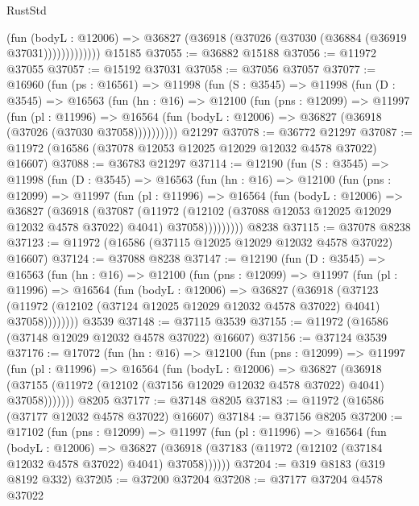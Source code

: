 \begin{lexlean}{RustStd}
\begin{coremodule}
                  (fun (bodyL : @12006) =>
                  @36827 (@36918 (@37026 (@37030 (@36884 (@36919 @37031)))))))))))))
    @15185
@37055 := @36882 @15188
@37056 := @11972 @37055
@37057 := @15192 @37031
@37058 := @37056 @37057
@37077 := @16960
    (fun (ps : @16561) =>
    @11998
      (fun (S : @3545) =>
      @11998
        (fun (D : @3545) =>
        @16563
          (fun (hn : @16) =>
          @12100
            (fun (pns : @12099) =>
            @11997
              (fun (pl : @11996) =>
              @16564 (fun (bodyL : @12006) => @36827 (@36918 (@37026 (@37030 @37058))))))))))
    @21297
@37078 := @36772 @21297
@37087 := @11972 (@16586 (@37078 @12053 @12025 @12029 @12032 @4578 @37022) @16607)
@37088 := @36783 @21297
@37114 := @12190
    (fun (S : @3545) =>
    @11998
      (fun (D : @3545) =>
      @16563
        (fun (hn : @16) =>
        @12100
          (fun (pns : @12099) =>
          @11997
            (fun (pl : @11996) =>
            @16564
              (fun (bodyL : @12006) =>
              @36827
                (@36918
                  (@37087
                    (@11972
                      (@12102 (@37088 @12053 @12025 @12029 @12032 @4578 @37022) @4041)
                      @37058)))))))))
    @8238
@37115 := @37078 @8238
@37123 := @11972 (@16586 (@37115 @12025 @12029 @12032 @4578 @37022) @16607)
@37124 := @37088 @8238
@37147 := @12190
    (fun (D : @3545) =>
    @16563
      (fun (hn : @16) =>
      @12100
        (fun (pns : @12099) =>
        @11997
          (fun (pl : @11996) =>
          @16564
            (fun (bodyL : @12006) =>
            @36827
              (@36918
                (@37123
                  (@11972 (@12102 (@37124 @12025 @12029 @12032 @4578 @37022) @4041) @37058))))))))
    @3539
@37148 := @37115 @3539
@37155 := @11972 (@16586 (@37148 @12029 @12032 @4578 @37022) @16607)
@37156 := @37124 @3539
@37176 := @17072
    (fun (hn : @16) =>
    @12100
      (fun (pns : @12099) =>
      @11997
        (fun (pl : @11996) =>
        @16564
          (fun (bodyL : @12006) =>
          @36827
            (@36918 (@37155 (@11972 (@12102 (@37156 @12029 @12032 @4578 @37022) @4041) @37058)))))))
    @8205
@37177 := @37148 @8205
@37183 := @11972 (@16586 (@37177 @12032 @4578 @37022) @16607)
@37184 := @37156 @8205
@37200 := @17102
    (fun (pns : @12099) =>
    @11997
      (fun (pl : @11996) =>
      @16564
        (fun (bodyL : @12006) =>
        @36827 (@36918 (@37183 (@11972 (@12102 (@37184 @12032 @4578 @37022) @4041) @37058))))))
@37204 := @319 @8183 (@319 @8192 @332)
@37205 := @37200 @37204
@37208 := @37177 @37204 @4578 @37022

\end{coremodule}
\end{lexlean}
